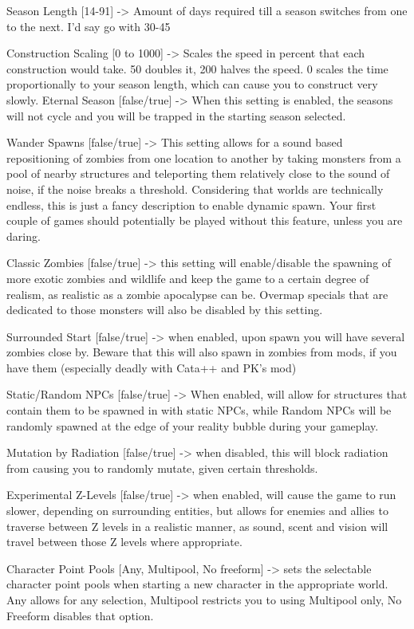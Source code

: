 Season Length [14-91] -> Amount of days required till a season switches from one to the next. I'd say go with 30-45

Construction Scaling [0 to 1000] -> Scales the speed in percent that each construction would take. 50 doubles it, 200 halves the speed. 0 scales the time proportionally to your season length, which can cause you to construct very slowly.
Eternal Season [false/true] -> When this setting is enabled, the seasons will not cycle and you will be trapped in the starting season selected.

Wander Spawns [false/true] -> This setting allows for a sound based repositioning of zombies from one location to another by taking monsters from a pool of nearby structures and teleporting them relatively close to the sound of noise, if the noise breaks a threshold. Considering that worlds are technically endless, this is just a fancy description to enable dynamic spawn. Your first couple of games should potentially be played without this feature, unless you are daring.

Classic Zombies [false/true] -> this setting will enable/disable the spawning of more exotic zombies and wildlife and keep the game to a certain degree of realism, as realistic as a zombie apocalypse can be. Overmap specials that are dedicated to those monsters will also be disabled by this setting.

Surrounded Start [false/true] -> when enabled, upon spawn you will have several zombies close by. Beware that this will also spawn in zombies from mods, if you have them (especially deadly with Cata++ and PK's mod)

Static/Random NPCs [false/true] -> When enabled, will allow for structures that contain them to be spawned in with static NPCs, while Random NPCs will be randomly spawned at the edge of your reality bubble during your gameplay.

Mutation by Radiation [false/true] -> when disabled, this will block radiation from causing you to randomly mutate, given certain thresholds.

Experimental Z-Levels [false/true] -> when enabled, will cause the game to run slower, depending on surrounding entities, but allows for enemies and allies to traverse between Z levels in a realistic manner, as sound, scent and vision will travel between those Z levels where appropriate.

Character Point Pools [Any, Multipool, No freeform] -> sets the selectable character point pools when starting a new character in the appropriate world. Any allows for any selection, Multipool restricts you to using Multipool only, No Freeform disables that option.

